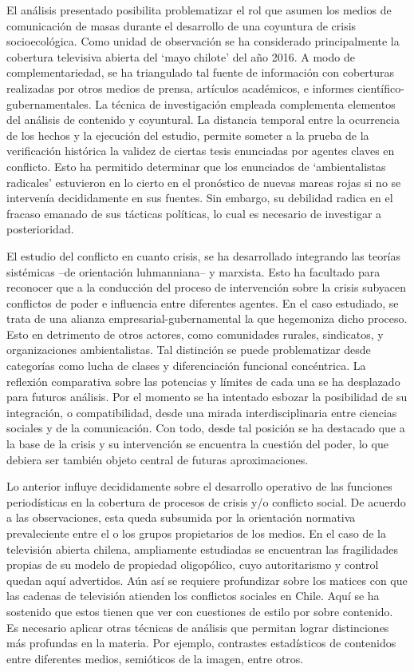 \documentclass{textolivre}
\begin{document}
El análisis presentado posibilita problematizar el rol que asumen los medios de
comunicación de masas durante el desarrollo de una coyuntura de crisis socioecológica.
Como unidad de observación se ha considerado principalmente la cobertura televisiva
abierta del ‘mayo chilote’ del año 2016. A modo de complementariedad, se ha triangulado
tal fuente de información con coberturas realizadas por otros medios de prensa, artículos
académicos, e informes científico-gubernamentales. La técnica de investigación empleada
complementa elementos del análisis de contenido y coyuntural. La distancia temporal
entre la ocurrencia de los hechos y la ejecución del estudio, permite someter a la prueba
de la verificación histórica la validez de ciertas tesis enunciadas por agentes claves en
conflicto. Esto ha permitido determinar que los enunciados de ‘ambientalistas radicales’
estuvieron en lo cierto en el pronóstico de nuevas mareas rojas si no se intervenía
decididamente en sus fuentes. Sin embargo, su debilidad radica en el fracaso emanado
de sus tácticas políticas, lo cual es necesario de investigar a posterioridad.

El estudio del conflicto en cuanto crisis, se ha desarrollado integrando las teorías
sistémicas --de orientación luhmanniana-- y marxista. Esto ha facultado para reconocer
que a la conducción del proceso de intervención sobre la crisis subyacen conflictos de
poder e influencia entre diferentes agentes. En el caso estudiado, se trata de una alianza
empresarial-gubernamental la que hegemoniza dicho proceso. Esto en detrimento de
otros actores, como comunidades rurales, sindicatos, y organizaciones ambientalistas. Tal
distinción se puede problematizar desde categorías como lucha de clases y diferenciación
funcional concéntrica. La reflexión comparativa sobre las potencias y límites de cada una
se ha desplazado para futuros análisis. Por el momento se ha intentado esbozar la
posibilidad de su integración, o compatibilidad, desde una mirada interdisciplinaria entre
ciencias sociales y de la comunicación. Con todo, desde tal posición se ha destacado que
a la base de la crisis y su intervención se encuentra la cuestión del poder, lo que debiera
ser también objeto central de futuras aproximaciones.

Lo anterior influye decididamente sobre el desarrollo operativo de las funciones
periodísticas en la cobertura de procesos de crisis y/o conflicto social. De acuerdo a las
observaciones, esta queda subsumida por la orientación normativa prevaleciente entre el
o los grupos propietarios de los medios. En el caso de la televisión abierta chilena,
ampliamente estudiadas se encuentran las fragilidades propias de su modelo de
propiedad oligopólico, cuyo autoritarismo y control quedan aquí advertidos. Aún así se
requiere profundizar sobre los matices con que las cadenas de televisión atienden los
conflictos sociales en Chile. Aquí se ha sostenido que estos tienen que ver con cuestiones
de estilo por sobre contenido. Es necesario aplicar otras técnicas de análisis que permitan
lograr distinciones más profundas en la materia. Por ejemplo, contrastes estadísticos de
contenidos entre diferentes medios, semióticos de la imagen, entre otros.
\end{document}
